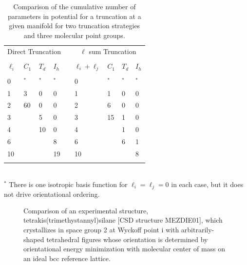 \documentclass[preprint]{iucr}              %
\begin{document}
\pagebreak

\begin{table}%
\caption{Comparison of the cumulative number of parameters in
potential for a truncation at a given manifold for two truncation
strategies and three molecular point groups.}\label{tab:truncation}
\begin{tabular}{lllllllll}
\multicolumn{4}{c}{Direct Truncation} & &\multicolumn{4}{c}{$\ell$ sum
Truncation}\\
\cline{1-4}\cline{6-9}\\
$\ell_i$ & $C_1$ & $T_d$ & $I_h$ & & $\ell_i+\ell_j$ & $C_1$ &
$T_d$ & $I_h$\\
\cline{1-4}\cline{6-9}\\
0  & $^*$  & $^*$  & $^*$  & & 0  & $^*$  & $^*$ & $^*$ \\
1  & 3  & 0  & 0  & & 1  & 1  & 0 & 0 \\
2  & 60 & 0  & 0  & & 2  & 6  & 0 & 0 \\
3  &    & 5  & 0  & & 3  & 15 & 1 & 0 \\
4  &    & 10 & 0  & & 4  &    & 1 & 0 \\
6  &    &    & 8  & & 6  &    & 6 & 1 \\
10 &    &    & 19 & & 10 &    &   & 8 \\
\cline{1-4}\cline{6-9}\\
\end{tabular}
\\$^*$ There is one isotropic basis function for $\ell_i=\ell_j=0$ in
each case, but it does not drive orientational ordering.
\end{table}

\pagebreak

\begin{figure}%
\caption{Comparison of an experimental structure,
tetrakis(trimethystannyl)silane  [CSD structure MEZDIE01], which
crystallizes in space group 2 at Wyckoff point i with
arbitrarily-shaped tetrahedral figures whose orientation is
determined by orientational energy minimization with molecular
center of mass on an ideal bcc reference lattice.\label{compare}}
\end{figure}
\end{document}
